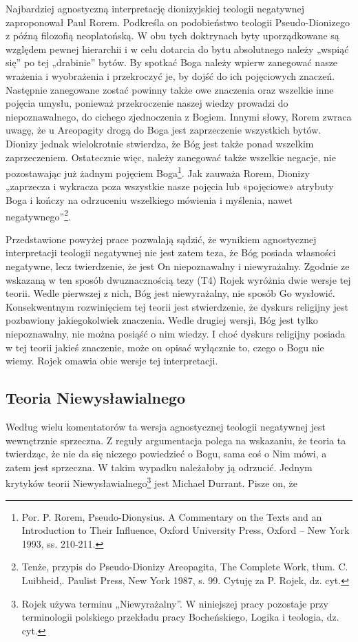Najbardziej agnostyczną interpretację dionizyjskiej teologii negatywnej
zaproponował Paul Rorem. Podkreśla on podobieństwo teologii
Pseudo-Dionizego z późną filozofią neoplatońską. W obu tych doktrynach
byty uporządkowane są względem pewnej hierarchii i w celu dotarcia do
bytu absolutnego należy „wspiąć się” po tej „drabinie” bytów. By
spotkać Boga należy wpierw zanegować nasze wrażenia i wyobrażenia i
przekroczyć je, by dojść do ich pojęciowych znaczeń. Następnie
zanegowane zostać powinny także owe znaczenia oraz wszelkie inne
pojęcia umysłu, ponieważ przekroczenie naszej wiedzy prowadzi do
niepoznawalnego, do cichego zjednoczenia z Bogiem. Innymi słowy, Rorem
zwraca uwagę, że u Areopagity drogą do Boga jest zaprzeczenie
wszystkich bytów. Dionizy jednak wielokrotnie stwierdza, że Bóg jest
także ponad wszelkim zaprzeczeniem. Ostatecznie więc, należy zanegować
także wszelkie negacje, nie pozostawając już żadnym pojęciem
Boga\footnote{Por. P. Rorem, Pseudo-Dionysius. A Commentary on the
Texts and an Introduction to Their Influence, Oxford University Press,
Oxford -- New York 1993, ss. 210-211. }. Jak zauważa Rorem, Dionizy
„zaprzecza i wykracza poza wszystkie nasze pojęcia lub «pojęciowe»
atrybuty Boga i kończy na odrzuceniu wszelkiego mówienia i myślenia,
nawet negatywnego”\footnote{Tenże, przypis do Pseudo-Dionizy
Areopagita, The Complete Work, tłum. C. Luibheid,. Paulist Press, New
York 1987, s. 99. Cytuję za P. Rojek, dz. cyt. }.

Przedstawione powyżej prace pozwalają sądzić, że wynikiem agnostycznej
interpretacji teologii negatywnej nie jest zatem teza, że Bóg posiada
własności negatywne, lecz twierdzenie, że jest On niepoznawalny i
niewyrażalny. Zgodnie ze wskazaną w ten sposób dwuznacznością tezy (T4)
Rojek wyróżnia dwie wersje tej teorii. Wedle pierwszej z nich, Bóg jest
niewyrażalny, nie sposób Go wysłowić. Konsekwentnym rozwinięciem tej
teorii jest stwierdzenie, że dyskurs religijny jest pozbawiony
jakiegokolwiek znaczenia. Wedle drugiej wersji, Bóg jest tylko
niepoznawalny, nie można posiąść o nim wiedzy. I choć dyskurs religijny
posiada w tej teorii jakieś znaczenie, może on opisać wyłącznie to,
czego o Bogu nie wiemy. Rojek omawia obie wersje tej interpretacji.



\subsection{Teoria Niewysławialnego}

Według wielu komentatorów ta wersja agnostycznej teologii negatywnej
jest wewnętrznie sprzeczna. Z reguły argumentacja polega na wskazaniu,
że teoria ta twierdząc, że nie da się niczego powiedzieć o Bogu, sama
coś o Nim mówi, a zatem jest sprzeczna. W takim wypadku należałoby ją
odrzucić. Jednym krytyków teorii Niewysławialnego\footnote{Rojek używa terminu „Niewyrażalny”. W
niniejszej pracy pozostaje przy terminologii polskiego przekładu pracy
Bocheńskiego, Logika i teologia, dz. cyt. } jest Michael Durrant.
Pisze on, że

